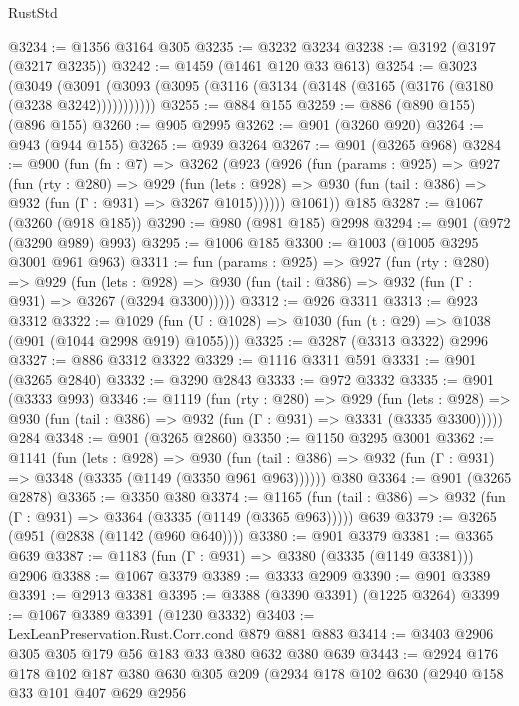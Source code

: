 \begin{lexlean}{RustStd}
\begin{coremodule}
@3234 := @1356 @3164 @305
@3235 := @3232 @3234
@3238 := @3192 (@3197 (@3217 @3235))
@3242 := @1459 (@1461 @120 @33 @613)
@3254 := @3023
    (@3049 (@3091 (@3093 (@3095 (@3116 (@3134 (@3148 (@3165 (@3176 (@3180 (@3238 @3242)))))))))))
@3255 := @884 @155
@3259 := @886 (@890 @155) (@896 @155)
@3260 := @905 @2995
@3262 := @901 (@3260 @920)
@3264 := @943 (@944 @155)
@3265 := @939 @3264
@3267 := @901 (@3265 @968)
@3284 := @900
    (fun (fn : @7) =>
    @3262
      (@923
        (@926
          (fun (params : @925) =>
          @927
            (fun (rty : @280) =>
            @929
              (fun (lets : @928) =>
              @930 (fun (tail : @386) => @932 (fun (Γ : @931) => @3267 @1015))))))
        @1061))
    @185
@3287 := @1067 (@3260 (@918 @185))
@3290 := @980 (@981 @185) @2998
@3294 := @901 (@972 (@3290 @989) @993)
@3295 := @1006 @185
@3300 := @1003 (@1005 @3295 @3001 @961 @963)
@3311 := fun (params : @925) =>
  @927
    (fun (rty : @280) =>
    @929
      (fun (lets : @928) =>
      @930 (fun (tail : @386) => @932 (fun (Γ : @931) => @3267 (@3294 @3300)))))
@3312 := @926 @3311
@3313 := @923 @3312
@3322 := @1029 (fun (U : @1028) => @1030 (fun (t : @29) => @1038 (@901 (@1044 @2998 @919) @1055)))
@3325 := @3287 (@3313 @3322) @2996
@3327 := @886 @3312 @3322
@3329 := @1116 @3311 @591
@3331 := @901 (@3265 @2840)
@3332 := @3290 @2843
@3333 := @972 @3332
@3335 := @901 (@3333 @993)
@3346 := @1119
    (fun (rty : @280) =>
    @929
      (fun (lets : @928) =>
      @930 (fun (tail : @386) => @932 (fun (Γ : @931) => @3331 (@3335 @3300)))))
    @284
@3348 := @901 (@3265 @2860)
@3350 := @1150 @3295 @3001
@3362 := @1141
    (fun (lets : @928) =>
    @930 (fun (tail : @386) => @932 (fun (Γ : @931) => @3348 (@3335 (@1149 (@3350 @961 @963))))))
    @380
@3364 := @901 (@3265 @2878)
@3365 := @3350 @380
@3374 := @1165
    (fun (tail : @386) => @932 (fun (Γ : @931) => @3364 (@3335 (@1149 (@3365 @963)))))
    @639
@3379 := @3265 (@951 (@2838 (@1142 (@960 @640))))
@3380 := @901 @3379
@3381 := @3365 @639
@3387 := @1183 (fun (Γ : @931) => @3380 (@3335 (@1149 @3381))) @2906
@3388 := @1067 @3379
@3389 := @3333 @2909
@3390 := @901 @3389
@3391 := @2913 @3381
@3395 := @3388 (@3390 @3391) (@1225 @3264)
@3399 := @1067 @3389 @3391 (@1230 @3332)
@3403 := LexLeanPreservation.Rust.Corr.cond @879 @881 @883
@3414 := @3403 @2906 @305 @305 @179 @56 @183 @33 @380 @632 @380 @639
@3443 := @2924
    @176
    @178
    @102
    @187
    @380
    @630
    @305
    @209
    (@2934
      @178
      @102
      @630
      (@2940
        @158
        @33
        @101
        @407
        @629
        @2956

\end{coremodule}
\end{lexlean}
